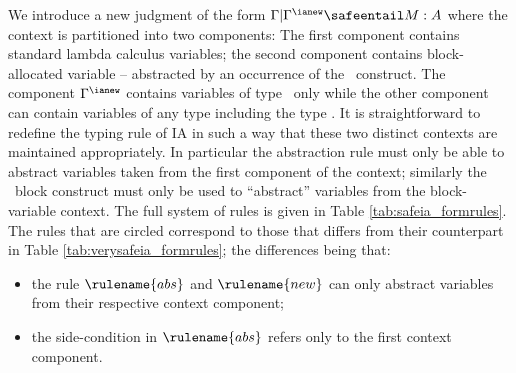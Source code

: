 We introduce a new judgment of the form $\Gamma | \Gamma^{\ianew}
\safeentail M : A$ where the context is partitioned into two
components: The first component contains standard lambda calculus
variables; the second component contains block-allocated variable --
abstracted by an occurrence of the \ianew\ construct. The component
$\Gamma^{\ianew}$ contains variables of type \iavar\ only while the
other component can contain variables of any type including the type
\iavar. It is straightforward to redefine the typing rule of IA in
such a way that these two distinct contexts are maintained
appropriately. In particular the abstraction rule must only be able
to abstract variables taken from the first component of the context;
similarly the \ianew\ block construct must only be used to
``abstract'' variables from the block-variable context. The full
system of rules is given in Table \ref{tab:safeia_formrules}. The
rules that are circled correspond to those that differs from their
counterpart in Table \ref{tab:verysafeia_formrules}; the differences
being that:
\begin{itemize}
\item the rule $\rulename{abs}$ and $\rulename{new}$ can only
abstract variables from their respective context component;
\item the side-condition in $\rulename{abs}$ refers only to
the first context component.
\end{itemize}

